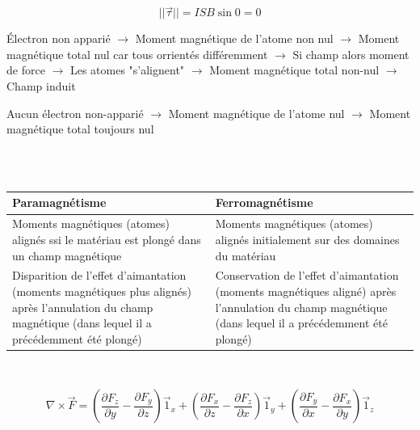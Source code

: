 \documentclass	[11pt, a4paper, openany]{book}
\begin{document}
$$ ||\vec \tau|| = ISB\sin0 = 0 $$


Électron non apparié $\rightarrow$ Moment magnétique de l'atome non nul $\rightarrow$ Moment magnétique total nul car tous orrientés différemment $\rightarrow$ Si champ alors moment de force $\rightarrow$ Les atomes "s'alignent" $\rightarrow$ Moment magnétique total non-nul $\rightarrow$ Champ induit


Aucun électron non-apparié $\rightarrow$ Moment magnétique de l'atome nul $\rightarrow$ Moment magnétique total toujours nul

\\\\
\renewcommand{\arraystretch}{1.8}
\begin{tabular}{|p{7.55cm}|p{7.55cm}|}
\hline
 Paramagnétisme & Ferromagnétisme \\
 \hline
 Moments magnétiques (atomes) alignés  ssi le matériau est plongé dans un champ magnétique &  Moments magnétiques (atomes) alignés initialement sur des domaines du matériau\\
 \hline
 Disparition de l'effet d'aimantation (moments magnétiques plus alignés) après l'annulation du champ magnétique (dans lequel il a précédemment été  plongé) &  Conservation de l'effet d'aimantation (moments magnétiques aligné) après l'annulation du champ magnétique (dans lequel il a précédemment été  plongé) \\
 \hline
\end{tabular}\\


$$ \nabla \times \vec F = \left(\frac{\partial F_z}{\partial y} - \frac{\partial F_y}{\partial z}\right)\vec 1_x + \left(\frac{\partial F_x}{\partial z} - \frac{\partial F_z}{\partial x}\right)\vec 1_y + \left(\frac{\partial F_y}{\partial x} - \frac{\partial F_x}{\partial y}\right)\vec 1_z $$
\end{document}
